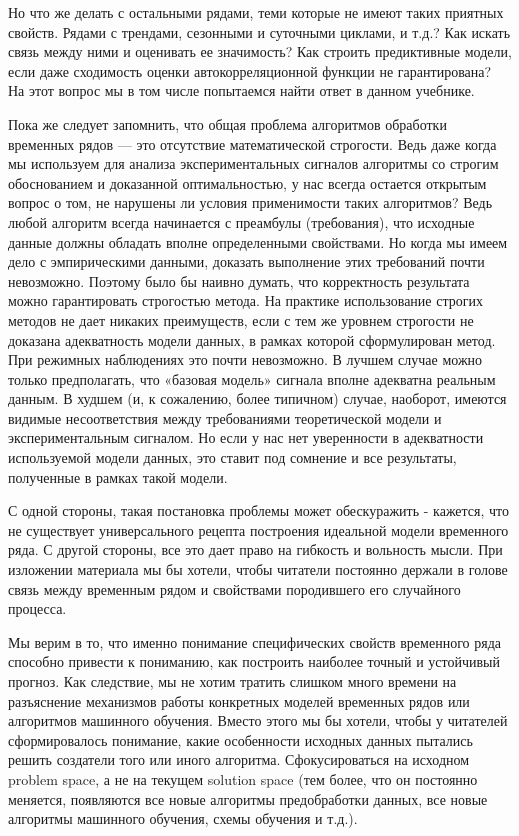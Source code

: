 Но что же делать с остальными рядами, теми которые не имеют таких
приятных свойств. Рядами с трендами, сезонными и суточными
циклами, и т.д.? Как искать связь между ними и оценивать ее
значимость? Как строить предиктивные модели, если даже сходимость
оценки автокорреляционной функции не гарантирована? На этот вопрос мы в том
числе попытаемся найти ответ в данном учебнике.

Пока же следует запомнить, что общая проблема алгоритмов обработки
временных рядов — это отсутствие математической строгости. Ведь даже когда
мы используем для анализа экспериментальных сигналов алгоритмы со
строгим обоснованием и доказанной оптимальностью, у нас всегда
остается открытым вопрос о том, не нарушены ли условия применимости
таких алгоритмов? Ведь любой алгоритм всегда начинается с преамбулы
(требования), что исходные данные должны обладать вполне
определенными свойствами. Но когда мы имеем дело с
эмпирическими данными, доказать выполнение этих требований
почти невозможно. Поэтому было бы наивно думать, что корректность
результата можно гарантировать строгостью метода. На практике
использование строгих методов не дает никаких преимуществ, если с
тем же уровнем строгости не доказана адекватность модели данных, в
рамках которой сформулирован метод. При режимных наблюдениях это
почти невозможно. В лучшем случае можно только предполагать, что
«базовая модель» сигнала вполне адекватна реальным данным. В худшем
(и, к сожалению, более типичном) случае, наоборот, имеются видимые
несоответствия между требованиями теоретической модели и
экспериментальным сигналом. Но если у нас нет уверенности в
адекватности используемой модели данных, это ставит под сомнение и
все результаты, полученные в рамках такой модели.

С одной стороны, такая постановка проблемы может обескуражить -
кажется, что не существует универсального рецепта построения
идеальной модели временного ряда. С другой стороны, все это дает
право на гибкость и вольность мысли.
При изложении материала мы бы хотели, чтобы читатели постоянно
держали в голове связь между временным рядом и свойствами
породившего его случайного процесса.

Мы верим в то, что именно понимание специфических
свойств временного ряда способно привести к пониманию, как
построить наиболее точный и устойчивый прогноз. Как следствие, мы
не хотим тратить слишком много времени на разъяснение механизмов
работы конкретных моделей временных рядов или алгоритмов машинного
обучения. Вместо этого мы бы хотели, чтобы у читателей
сформировалось понимание, какие особенности исходных данных
пытались решить создатели того или иного алгоритма. Сфокусироваться
на исходном problem space, а не на текущем solution space
(тем более, что он постоянно меняется, появляются все новые алгоритмы
  предобработки данных, все новые алгоритмы машинного обучения, схемы
обучения и т.д.).


